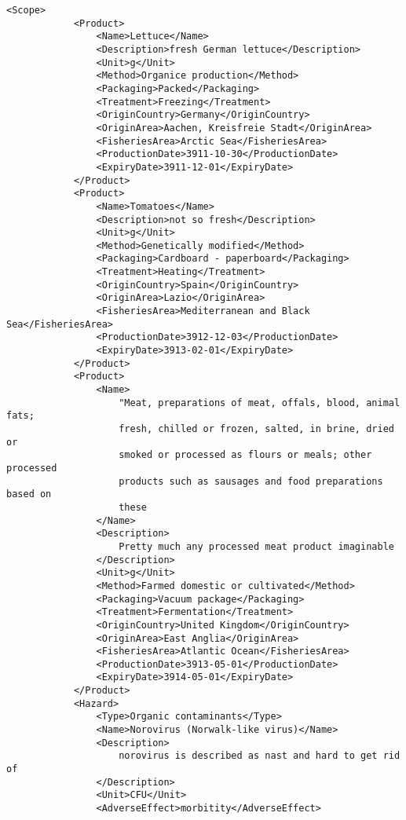 \documentclass[a4paper]{report}
\begin{document}
\begin{lstlisting}[language=RAKIP, caption={Example of StudySample}]
        <Scope>
            <Product>
                <Name>Lettuce</Name>
                <Description>fresh German lettuce</Description>
                <Unit>g</Unit>
                <Method>Organice production</Method>
                <Packaging>Packed</Packaging>
                <Treatment>Freezing</Treatment>
                <OriginCountry>Germany</OriginCountry>
                <OriginArea>Aachen, Kreisfreie Stadt</OriginArea>
                <FisheriesArea>Arctic Sea</FisheriesArea>
                <ProductionDate>3911-10-30</ProductionDate>
                <ExpiryDate>3911-12-01</ExpiryDate>
            </Product>
            <Product>
                <Name>Tomatoes</Name>
                <Description>not so fresh</Description>
                <Unit>g</Unit>
                <Method>Genetically modified</Method>
                <Packaging>Cardboard - paperboard</Packaging>
                <Treatment>Heating</Treatment>
                <OriginCountry>Spain</OriginCountry>
                <OriginArea>Lazio</OriginArea>
                <FisheriesArea>Mediterranean and Black Sea</FisheriesArea>
                <ProductionDate>3912-12-03</ProductionDate>
                <ExpiryDate>3913-02-01</ExpiryDate>
            </Product>
            <Product>
                <Name>
                    "Meat, preparations of meat, offals, blood, animal fats;
                    fresh, chilled or frozen, salted, in brine, dried or
                    smoked or processed as flours or meals; other processed
                    products such as sausages and food preparations based on
                    these
                </Name>
                <Description>
                    Pretty much any processed meat product imaginable
                </Description>
                <Unit>g</Unit>
                <Method>Farmed domestic or cultivated</Method>
                <Packaging>Vacuum package</Packaging>
                <Treatment>Fermentation</Treatment>
                <OriginCountry>United Kingdom</OriginCountry>
                <OriginArea>East Anglia</OriginArea>
                <FisheriesArea>Atlantic Ocean</FisheriesArea>
                <ProductionDate>3913-05-01</ProductionDate>
                <ExpiryDate>3914-05-01</ExpiryDate>
            </Product>
            <Hazard>
                <Type>Organic contaminants</Type>
                <Name>Norovirus (Norwalk-like virus)</Name>
                <Description>
                    norovirus is described as nast and hard to get rid of
                </Description>
                <Unit>CFU</Unit>
                <AdverseEffect>morbitity</AdverseEffect>

\end{lstlisting}
\end{document}
